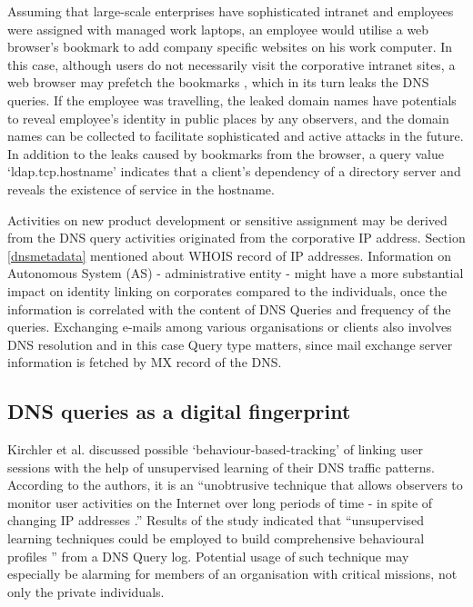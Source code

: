 Assuming that large-scale enterprises have sophisticated intranet and employees were assigned with managed work laptops, an employee would utilise a web browser's bookmark to add company specific websites on his work computer.
In this case, although users do not necessarily visit the corporative intranet sites, a web browser may prefetch the bookmarks \cite{firefox-autocomplete-url, chrome-dns-prefectching}, which in its turn leaks the DNS queries.
If the employee was travelling, the leaked domain names have potentials to reveal employee's identity in public places by any observers, and the domain names can be collected to facilitate sophisticated and active attacks in the future.
In addition to the leaks caused by bookmarks from the browser, a query value `\textunderscore ldap.\textunderscore tcp.hostname' indicates that a client's dependency of a directory server \cite{Shulman:2014} and reveals the existence of service in the hostname.

Activities on new product development or sensitive assignment may be derived from the DNS query activities originated from the corporative IP address. Section \ref{dnsmetadata} mentioned about WHOIS record of IP addresses. Information on Autonomous System (AS) - administrative entity - might have a more substantial impact on identity linking on corporates compared to the individuals, once the information is correlated with the content of DNS Queries and frequency of the queries. Exchanging e-mails among various organisations or clients also involves DNS resolution and in this case Query type matters, since mail exchange server information is fetched by MX record of the DNS.

\subsection{DNS queries as a digital fingerprint}\label{fingerprint}
Kirchler et al. discussed possible `behaviour-based-tracking' of linking user sessions with the help of unsupervised learning of their DNS traffic patterns.
According to the authors, it is an ``unobtrusive technique that allows observers to monitor user activities on the Internet over long periods of time - in spite of changing IP addresses \cite{kirchler2016tracked}.''
Results of the study indicated that ``unsupervised learning techniques could be employed to build comprehensive behavioural profiles \cite{kirchler2016tracked}'' from a DNS Query log.
Potential usage of such technique may especially be alarming for members of an organisation with critical missions, not only the private individuals.

